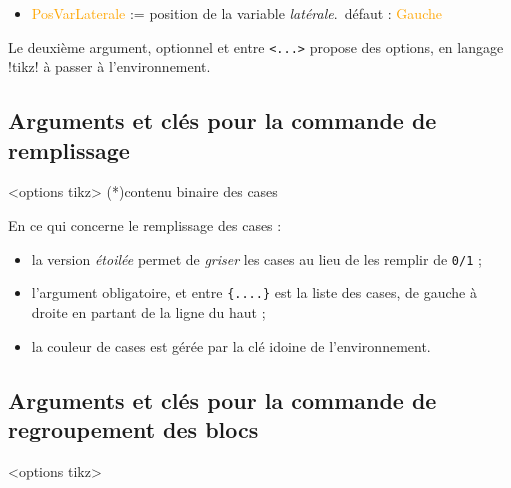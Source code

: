 \documentclass[french,a4paper,11pt]{article}
\newcommand\Cle[1]{{\small\sffamily\textlangle \textcolor{orange}{#1}\textrangle}}
\begin{document}
{{\begin{tipblock}
\begin{itemize}
	\hfill~défaut : \Cle{black}
	\item \Cle{PosVarLaterale} := position de la variable \textit{latérale}.\hfill~défaut : \Cle{Gauche}
\end{itemize}

Le deuxième argument, optionnel et entre \texttt{<...>} propose des options, en langage \packagetex!tikz! à passer à l'environnement.
\end{tipblock}

\subsection{Arguments et clés pour la commande de remplissage}

\begin{DemoCode}
\begin{TableKarnaugh}[clés]<options tikz>
	\KarnaughCasesResult(*){contenu binaire des cases}
\end{TableKarnaugh}
\end{DemoCode}

\begin{tipblock}
En ce qui concerne le remplissage des cases :

\begin{itemize}
	\item la version \textit{étoilée} permet de \textit{griser} les cases au lieu de les remplir de \texttt{0/1} ;
	\item l'argument obligatoire, et entre \texttt{\{....\}} est la liste des cases, de gauche à droite en partant de la ligne du haut ;
	\item la couleur de cases est gérée par la clé idoine de l'environnement.
\end{itemize}
\vspace*{-\baselineskip}\leavevmode
\end{tipblock}

\subsection{Arguments et clés pour la commande de regroupement des blocs}

\begin{DemoCode}
\begin{TableKarnaugh}[clés]<options tikz>
\end{TableKarnaugh}
\end{DemoCode}

}}
\end{document}
